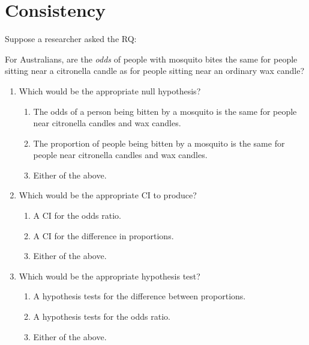 \documentclass[
  11pt,
  a4paper,
  krantz2]{krantz}
\makeatletter
\providecommand{\tightlist}{%
  \setlength{\itemsep}{0pt}\setlength{\parskip}{0pt}}
\renewenvironment{quote}%
{\begin{kframe}}
{\end{kframe}}
\newenvironment{kframe}{%
\medskip{}
\setlength{\fboxsep}{.8em}
 \def\at@end@of@kframe{}%
 \ifinner\ifhmode%
  \def\at@end@of@kframe{\end{minipage}}%
  \begin{minipage}{\columnwidth}%
 \fi\fi%
 \def\FrameCommand##1{\hskip\@totalleftmargin \hskip-\fboxsep
 \colorbox{shadecolor}{##1}\hskip-\fboxsep
     \hskip-\linewidth \hskip-\@totalleftmargin \hskip\columnwidth}%
 \MakeFramed {\advance\hsize-\width
   \@totalleftmargin\z@ \linewidth\hsize
   \@setminipage}}%
 {\par\unskip\endMakeFramed%
 \at@end@of@kframe}
\renewenvironment{quote}
               {\list{}{\vspace{-0.5em}\begin{kframe}\small%
                        \rightmargin   \leftmargin
                        \parsep        \z@ \@plus\p@}%
                \item\relax}
               {\end{kframe}\endlist}
\makeatother
\begin{document}
\section{Consistency}\label{Consistency}

Suppose a researcher asked the RQ:

\begin{quote}
For Australians, are the \emph{odds} of people with mosquito bites the same for people sitting near a citronella candle as for people sitting near an ordinary wax candle?
\end{quote}

\begin{enumerate}
\def\labelenumi{\arabic{enumi}.}
\item
  Which would be the appropriate null hypothesis?
  \null

  \begin{enumerate}
  \def\labelenumii{\alph{enumii}.}
  \tightlist
  \item
    The odds of a person being bitten by a mosquito is the same for people near citronella candles and wax candles.
  \item
    The proportion of people being bitten by a mosquito is the same for people near citronella candles and wax candles.
  \item
    Either of the above.
  \end{enumerate}
\item
  Which would be the appropriate CI to produce?
  \null

  \begin{enumerate}
  \def\labelenumii{\alph{enumii}.}
  \tightlist
  \item
    A CI for the odds ratio.
  \item
    A CI for the difference in proportions.
  \item
    Either of the above.
  \end{enumerate}
\item
  Which would be the appropriate hypothesis test?
  \null

  \begin{enumerate}
  \def\labelenumii{\alph{enumii}.}
  \tightlist
  \item
    A hypothesis tests for the difference between proportions.
  \item
    A hypothesis tests for the odds ratio.
  \item
    Either of the above.
  \end{enumerate}
\end{enumerate}
\end{document}

